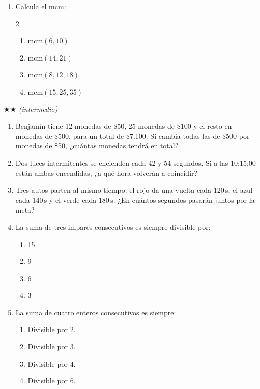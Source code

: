 \documentclass[11pt, letterpaper]{article}
\begin{document}
\begin{enumerate}[label=\textbf{\arabic*.}, leftmargin=*]
  \item Calcula el mcm:
  \begin{multicols}{2}
  \begin{enumerate}[label=\alph*)]
    \item $\text{mcm}(6,10)$
    \item $\text{mcm}(14,21)$
    \item $\text{mcm}(8,12,18)$
    \item $\text{mcm}(15,25,35)$
  \end{enumerate}
  \end{multicols}
\end{enumerate}

$\bigstar\bigstar$ \textit{(intermedio)}

\begin{enumerate}[label=\textbf{\arabic*.}, leftmargin=*, resume]
  \item Benjam\'in tiene 12 monedas de \$50, 25 monedas de \$100 y el resto en monedas de \$500, para un total de \$7.100. Si cambia todas las de \$500 por monedas de \$50, ¿cu\'antas monedas tendr\'a en total?
  \vspace{3cm}

  \item Dos luces intermitentes se encienden cada 42 y 54 segundos. Si a las 10:15:00 est\'an ambas encendidas, ¿a qu\'e hora volver\'an a coincidir?
  \vspace{3cm}

  \item Tres autos parten al mismo tiempo: el rojo da una vuelta cada 120\,s, el azul cada 140\,s y el verde cada 180\,s. ¿En cu\'antos segundos pasar\'an juntos por la meta?
  \vspace{3cm}

  \item La suma de tres impares consecutivos es siempre divisible por:
  \begin{enumerate}[label=\Alph*), leftmargin=2cm, itemsep=2pt]
    \item 15
    \item 9
    \item 6
    \item 3
  \end{enumerate}
  \vspace{2.5cm}

  \item La suma de cuatro enteros consecutivos es siempre:
  \begin{enumerate}[label=\Alph*), leftmargin=2cm, itemsep=2pt]
    \item Divisible por 2.
    \item Divisible por 3.
    \item Divisible por 4.
    \item Divisible por 6.
  \end{enumerate}
  \vspace{2.5cm}
\end{enumerate}
\end{document}
